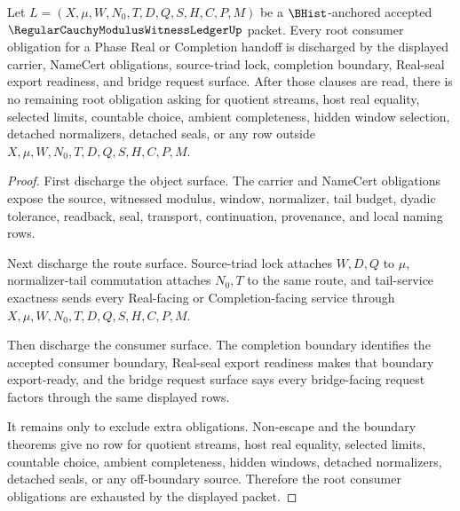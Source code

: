 \begin{theorem}
\label{thm:regular-cauchy-modulus-witness-ledger-consumer-obligation-exhaustion}
Let $L=(X,\mu,W,N_0,T,D,Q,S,H,C,P,M)$ be a $\BHist$-anchored accepted $\RegularCauchyModulusWitnessLedgerUp$ packet. Every root consumer obligation for a Phase Real or Completion handoff is discharged by the displayed carrier, NameCert obligations, source-triad lock, completion boundary, Real-seal export readiness, and bridge request surface. After those clauses are read, there is no remaining root obligation asking for quotient streams, host real equality, selected limits, countable choice, ambient completeness, hidden window selection, detached normalizers, detached seals, or any row outside $X,\mu,W,N_0,T,D,Q,S,H,C,P,M$.
\end{theorem}
\begin{proof}
First discharge the object surface. The carrier and NameCert obligations expose the source, witnessed modulus, window, normalizer, tail budget, dyadic tolerance, readback, seal, transport, continuation, provenance, and local naming rows.

Next discharge the route surface. Source-triad lock attaches $W,D,Q$ to $\mu$, normalizer-tail commutation attaches $N_0,T$ to the same route, and tail-service exactness sends every Real-facing or Completion-facing service through $X,\mu,W,N_0,T,D,Q,S,H,C,P,M$.

Then discharge the consumer surface. The completion boundary identifies the accepted consumer boundary, Real-seal export readiness makes that boundary export-ready, and the bridge request surface says every bridge-facing request factors through the same displayed rows.

It remains only to exclude extra obligations. Non-escape and the boundary theorems give no row for quotient streams, host real equality, selected limits, countable choice, ambient completeness, hidden windows, detached normalizers, detached seals, or any off-boundary source. Therefore the root consumer obligations are exhausted by the displayed packet.
\end{proof}


